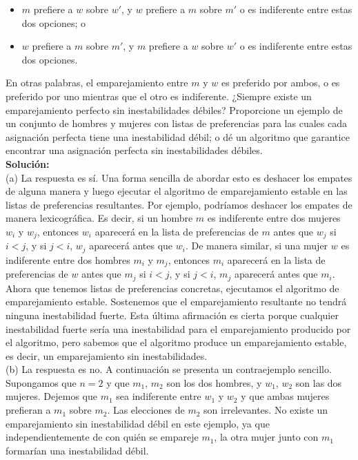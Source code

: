 \documentclass{article}
\begin{document}
\begin{itemize}
    \item $m$ prefiere a $w$ sobre $w'$, y $w$ prefiere a $m$ sobre $m'$ o es indiferente entre estas dos opciones; o
    \item $w$ prefiere a $m$ sobre $m'$, y $m$ prefiere a $w$ sobre $w'$ o es indiferente entre estas dos opciones.
\end{itemize}

En otras palabras, el emparejamiento entre $m$ y $w$ es preferido por ambos, o es preferido por uno mientras que el otro es indiferente. ¿Siempre existe un emparejamiento perfecto sin inestabilidades débiles? Proporcione un ejemplo de un conjunto de hombres y mujeres con listas de preferencias para las cuales cada asignación perfecta tiene una inestabilidad débil; o dé un algoritmo que garantice encontrar una asignación perfecta sin inestabilidades débiles.\\

\textbf{Solución:}\\

(a) La respuesta es sí. Una forma sencilla de abordar esto es deshacer los empates de alguna manera y luego ejecutar el algoritmo de emparejamiento estable en las listas de preferencias resultantes. Por ejemplo, podríamos deshacer los empates de manera lexicográfica. Es decir, si un hombre $m$ es indiferente entre dos mujeres $w_i$ y $w_j$, entonces $w_i$ aparecerá en la lista de preferencias de $m$ antes que $w_j$ si $i < j$, y si $j < i$, $w_j$ aparecerá antes que $w_i$. De manera similar, si una mujer $w$ es indiferente entre dos hombres $m_i$ y $m_j$, entonces $m_i$ aparecerá en la lista de preferencias de $w$ antes que $m_j$ si $i < j$, y si $j < i$, $m_j$ aparecerá antes que $m_i$.\\

Ahora que tenemos listas de preferencias concretas, ejecutamos el algoritmo de emparejamiento estable. Sostenemos que el emparejamiento resultante no tendrá ninguna inestabilidad fuerte. Esta última afirmación es cierta porque cualquier inestabilidad fuerte sería una inestabilidad para el emparejamiento producido por el algoritmo, pero sabemos que el algoritmo produce un emparejamiento estable, es decir, un emparejamiento sin inestabilidades.\\

(b) La respuesta es no. A continuación se presenta un contraejemplo sencillo. Supongamos que $n = 2$ y que $m_1$, $m_2$ son los dos hombres, y $w_1$, $w_2$ son las dos mujeres. Dejemos que $m_1$ sea indiferente entre $w_1$ y $w_2$ y que ambas mujeres prefieran a $m_1$ sobre $m_2$. Las elecciones de $m_2$ son irrelevantes. No existe un emparejamiento sin inestabilidad débil en este ejemplo, ya que independientemente de con quién se empareje $m_1$, la otra mujer junto con $m_1$ formarían una inestabilidad débil.
\end{document}
